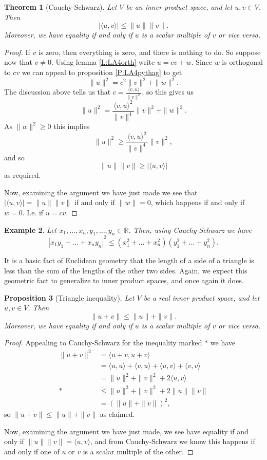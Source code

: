 \documentclass{article}
\theoremstyle{plain}
\newtheorem{theorem}{Theorem}[section]{\bfseries}{\itshape}
\newtheorem{proposition}[theorem]{Proposition}{\bfseries}{\itshape}
\newtheorem{example}[theorem]{Example}{\bfseries}{\upshape}
\newcommand{\bR}{\mathbb{R}}
\begin{document}
\begin{theorem}[Cauchy-Schwarz]\label{T:LA4CS}
Let $V$ be an inner product space, and let $u,v\in V$. Then
\[|\langle u, v\rangle| \leq\|u\|\|v\|.\]
Moreover, we have equality if and only if $u$ is a scalar multiple of $v$ or vice versa.
\end{theorem}
\begin{proof}
If $v$ is zero, then everything is zero, and there is nothing to do. So suppose now that $v\neq 0$. Using lemma \ref{L:LA4orth} write $u = cv + w$. Since $w$ is orthogonal to $cv$ we can appeal to proposition \ref{P:LA4pythag} to get
\[\|u\|^2 = c^2\|v\|^2 +\|w\|^2.\]
The discussion above tells us that $c = \frac{\langle v, u \rangle}{\|v\|^2}$, so this gives us
\[\|u\|^2 =\frac{\langle v, u \rangle^2}{\|v\|^4}\|v\|^2 + \|w\|^2.\]
As $\|w\|^2\geq 0$ this implies 
\[\|u\|^2 \geq \frac{\langle v, u \rangle^2}{\|v\|^4}\|v\|^2,\]
and so
\[\|u\|\|v\| \geq |\langle u, v\rangle|\]  
as required.

Now, examining the argument we have just made we see that $|\langle u, v\rangle| =\|u\|\|v\|$ if and only if $\|w\| = 0$, which happens if and only if $w = 0$. I.e. if $u=cv$.
\end{proof}

\begin{example}
Let $x_1,\ldots,x_n,y_1,\ldots,y_n \in\bR$. Then, using Cauchy-Schwarz we have
\[|x_1y_1+\ldots +x_ny_n|^2\leq (x_1^2+\ldots + x_n^2)(y_1^2+\ldots +y_n^2).\]
\end{example}

It is a basic fact of Euclidean geometry that the length of a side of a triangle is less than the sum of the lengths of the other two sides. Again, we expect this geometric fact to generalize to inner product spaces, and once again it does.

\begin{proposition}[Triangle inequality]\label{P:LA4tri}
Let $V$ be a real inner product space, and let $u,v\in V$. Then 
\[\|u + v \|\leq \|u\|+\|v\|.\]
Moreover, we have equality if and only if $u$ is a scalar multiple of $v$ or vice versa.
\end{proposition} 
\begin{proof}
Appealing to Cauchy-Schwarz for the inequality marked $*$ we have
\begin{align*}
\|u+v\|^2 &= \langle u+v, u+v \rangle \\
&= \langle u,u \rangle + \langle v,u \rangle + \langle u,v \rangle + \langle v,v \rangle\\
&= \|u\|^2 + \|v\|^2 + 2\langle u, v \rangle\\
*&\leq \|u\|^2 + \|v\|^2 + 2\|u\|\|v\| \\
&= (\|u\|+ \|v\|)^2,
\end{align*}
so $\|u+v\|\leq \|u\|+ \|v\|$ as claimed.

Now, examining the argument we have just made, we see have equality if and only if $\|u\|\|v\|= \langle u, v \rangle$, and from Cauchy-Schwarz we know this happens if and only if one of $u$ or $v$ is a scalar multiple of the other.
\end{proof}
\end{document}
